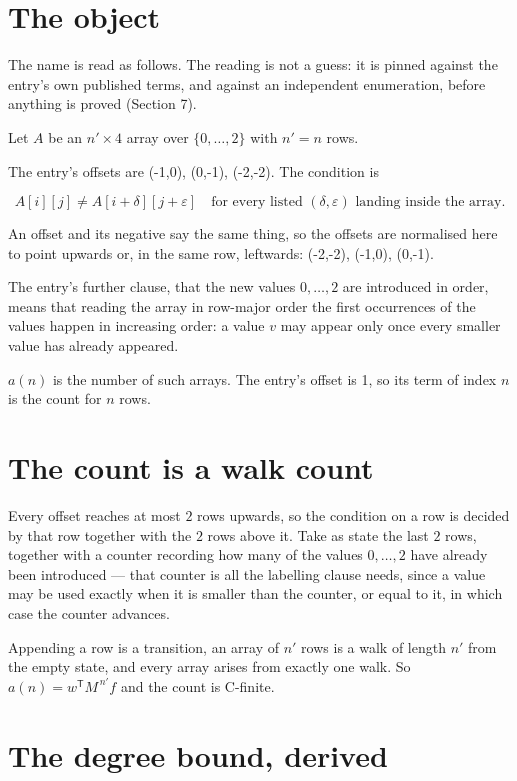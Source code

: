 \documentclass[11pt]{article}
\theoremstyle{definition}
\begin{document}
\section{The object}

The name is read as follows. The reading is not a guess: it is pinned against the entry's own published terms, and against an independent enumeration, before anything is proved (Section 7).

Let $A$ be an $n' \times 4$ array over $\{0,\dots,2\}$ with $n' = n$ rows.

The entry's offsets are (-1,0), (0,-1), (-2,-2). The condition is

\[A[i][j] \ne A[i{+}\delta][j{+}\varepsilon]\quad\text{for every listed }(\delta,\varepsilon)\text{ landing inside the array.}\]

An offset and its negative say the same thing, so the offsets are normalised here to point upwards or, in the same row, leftwards: (-2,-2), (-1,0), (0,-1).

The entry's further clause, that the new values $0,\dots,2$ are introduced in order, means that reading the array in row-major order the first occurrences of the values happen in increasing order: a value $v$ may appear only once every smaller value has already appeared.

$a(n)$ is the number of such arrays. The entry's offset is 1, so its term of index $n$ is the count for $n$ rows.

\section{The count is a walk count}

Every offset reaches at most $2$ rows upwards, so the condition on a row is decided by that row together with the $2$ rows above it. Take as state the last $2$ rows, together with a counter recording how many of the values $0,\dots,2$ have already been introduced --- that counter is all the labelling clause needs, since a value may be used exactly when it is smaller than the counter, or equal to it, in which case the counter advances.

Appending a row is a transition, an array of $n'$ rows is a walk of length $n'$ from the empty state, and every array arises from exactly one walk. So $a(n) = w^{\mathsf T}M^{\,n'}f$ and the count is C-finite.

\section{The degree bound, derived}
\end{document}
